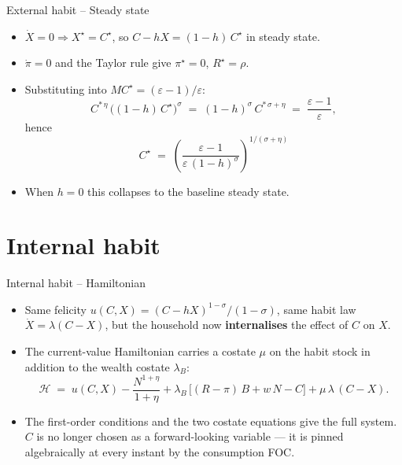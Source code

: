\documentclass[11pt,aspectratio=169]{beamer}
\begin{document}
\begin{frame}{External habit -- Steady state}

\begin{itemize}

\item $\dot X = 0 \Rightarrow X^\star = C^\star$, so $C - hX = (1-h)\,C^\star$ in
  steady state.\newline

\item $\dot\pi = 0$ and the Taylor rule give $\pi^\star = 0$, $R^\star = \rho$.\newline

\item Substituting into $MC^\star = (\varepsilon-1)/\varepsilon$:
  \[
  C^{*\,\eta}\,\bigl((1-h)\,C^\star\bigr)^\sigma \;=\;
  (1-h)^\sigma\,C^{*\,\sigma+\eta}
  \;=\; \frac{\varepsilon-1}{\varepsilon},
  \]
  hence
  \[
  \boxed{C^\star \;=\; \left(\frac{\varepsilon-1}{\varepsilon\,(1-h)^\sigma}\right)^{1/(\sigma+\eta)}}
  \]

\item When $h=0$ this collapses to the baseline steady state.

\end{itemize}

\end{frame}

\section{Internal habit}

\begin{frame}{Internal habit -- Hamiltonian}

\begin{itemize}

\item Same felicity $u(C,X) = (C - h X)^{1-\sigma}/(1-\sigma)$, same
  habit law $\dot X = \lambda(C - X)$, but the household now
  \textbf{internalises} the effect of $C$ on $X$.\newline

\item The current-value Hamiltonian carries a costate $\mu$ on the
  habit stock in addition to the wealth costate $\lambda_B$:
  \[
  \mathcal H \;=\; u(C, X) - \frac{N^{1+\eta}}{1+\eta}
  + \lambda_B\,\bigl[(R-\pi)\,B + w\,N - C\bigr]
  + \mu\,\lambda\,(C - X).
  \]

\item The first-order conditions and the two costate equations give
  the full system. $C$ is no longer chosen as a forward-looking variable
  — it is pinned algebraically at every instant by the consumption FOC.

\end{itemize}

\end{frame}
\end{document}
